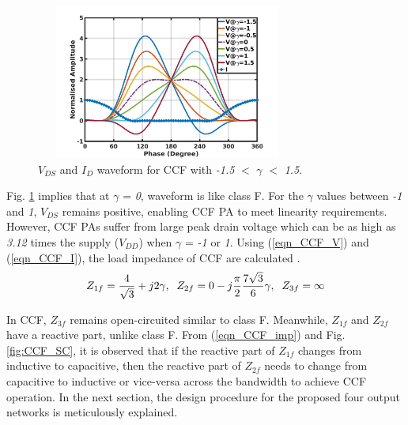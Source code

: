 \documentclass[conference]{IEEEtran}
\begin{document}
\begin{figure}[!t]
\centering
\captionsetup{font=footnotesize}
\includegraphics[width=3.4in, height=2in]{Images/CCF/CCF_wave_VI.jpg}
\caption{$V_{DS}$ and $I_D$ waveform for CCF with \textit{-1.5} $<$ $\gamma$ $<$ \textit{1.5}.}
\label{fig:CCF_wave_VI}
\vspace{-0.25in}
\end{figure}

Fig. \ref{fig:CCF_wave_VI} implies that at $\gamma$ = \textit{0}, waveform is like class F. For the $\gamma$ values between \textit{-1} and \textit{1}, $V_{DS}$ remains positive, enabling CCF PA to meet linearity requirements. However, CCF PAs suffer from large peak drain voltage which can be as high as \textit{3.12} times the supply ($V_{DD}$) when $\gamma$ = \textit{-1} or \textit{1}. Using (\ref{eqn_CCF_V}) and (\ref{eqn_CCF_I}), the load impedance of CCF  are calculated \cite{CCFDesign_ali}.
\begin{equation}
\begin{aligned}
Z_{1f}=\frac{4}{\sqrt{3}}+j 2 \gamma, \hspace{2mm}
Z_{2f}=0-j \frac{\pi}{2} \frac{7 \sqrt{3}}{6} \gamma,\hspace{2mm}
Z_{3f}=\infty
\label{eqn_CCF_imp}
\end{aligned}
\end{equation}

In CCF, $Z_{3f}$ remains open-circuited similar to class F. Meanwhile, $Z_{1f}$ and $Z_{2f}$ have a reactive part, unlike class F. From (\ref{eqn_CCF_imp}) and Fig. \ref{fig:CCF_SC}, it is observed that if the reactive part of $Z_{1f}$ changes from inductive to capacitive, then the reactive part of $Z_{2f}$  needs to change from capacitive to inductive or vice-versa across the bandwidth to achieve CCF operation. In the next section, the design procedure for the proposed four output networks is meticulously explained. 
\end{document}
